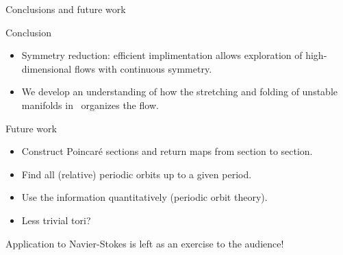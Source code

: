 \documentclass{beamer}
\begin{document}
 \begin{frame}{Conclusions and future work}
 
\begin{block}{Conclusion}
  \begin{itemize}
   \item Symmetry reduction: efficient implimentation allows exploration of high-dimensional flows with continuous symmetry.
   \item We develop an understanding of how the stretching and folding
  	of unstable manifolds in \KSe\ organizes the flow.
  \end{itemize}
\end{block}


\begin{block}{Future work}
\begin{itemize}
  \item Construct Poincar\'e sections and return maps from section to section.
  \item Find all (relative) periodic orbits up to a given period.
  \item Use the information quantitatively (periodic orbit theory).
  \item Less trivial tori?
\end{itemize}
\end{block}

\end{frame}

\begin{frame}{}

\begin{block}{}
 Application to Navier-Stokes is left as an exercise to the audience!
\end{block}

\end{frame}
\end{document}

